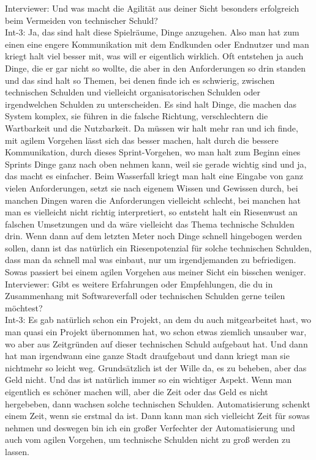 Interviewer: Und was macht die Agilität aus deiner Sicht besonders erfolgreich beim Vermeiden von technischer Schuld?\\
Int-3: Ja, das sind halt diese Spielräume, Dinge anzugehen. Also man hat zum einen eine engere Kommunikation mit dem Endkunden oder Endnutzer und man kriegt halt viel besser mit, was will er eigentlich wirklich. Oft entstehen ja auch Dinge, die er gar nicht so wollte, die aber in den Anforderungen so drin standen und das sind halt so Themen, bei denen finde ich es schwierig, zwischen technischen Schulden und vielleicht organisatorischen Schulden oder irgendwelchen Schulden zu unterscheiden. Es sind halt Dinge, die machen das System komplex, sie führen in die falsche Richtung, verschlechtern die Wartbarkeit und die Nutzbarkeit. Da müssen wir halt mehr ran und ich finde, mit agilem Vorgehen lässt sich das besser machen, halt durch die bessere Kommunikation, durch dieses Sprint-Vorgehen, wo man halt zum Beginn eines Sprints Dinge ganz nach oben nehmen kann, weil sie gerade wichtig sind und ja, das macht es einfacher. Beim Wasserfall kriegt man halt eine Eingabe von ganz vielen Anforderungen, setzt sie nach eigenem Wissen und Gewissen durch, bei manchen Dingen waren die Anforderungen vielleicht schlecht, bei manchen hat man es vielleicht nicht richtig interpretiert, so entsteht halt ein Riesenwust an falschen Umsetzungen und da wäre vielleicht das Thema technische Schulden drin. Wenn dann auf dem letzten Meter noch Dinge schnell hingebogen werden sollen, dann ist das natürlich ein Riesenpotenzial für solche technischen Schulden, dass man da schnell mal was einbaut, nur um irgendjemanden zu befriedigen. Sowas passiert bei einem agilen Vorgehen aus meiner Sicht ein bisschen weniger.\\
Interviewer: Gibt es weitere Erfahrungen oder Empfehlungen, die du in Zusammenhang mit Softwareverfall oder technischen Schulden gerne teilen möchtest?\\
Int-3: Es gab natürlich schon ein Projekt, an dem du auch mitgearbeitet hast, wo man quasi ein Projekt übernommen hat, wo schon etwas ziemlich unsauber war, wo aber aus Zeitgründen auf dieser technischen Schuld aufgebaut hat. Und dann hat man irgendwann eine ganze Stadt draufgebaut und dann kriegt man sie nichtmehr so leicht weg. Grundsätzlich ist der Wille da, es zu beheben, aber das Geld nicht. Und das ist natürlich immer so ein wichtiger Aspekt. Wenn man eigentlich es schöner machen will, aber die Zeit oder das Geld es nicht hergebeben, dann wachsen solche technischen Schulden. Automatisierung schenkt einem Zeit, wenn sie erstmal da ist. Dann kann man sich vielleicht Zeit für sowas nehmen und deswegen bin ich ein großer Verfechter der Automatisierung und auch vom agilen Vorgehen, um technische Schulden nicht zu groß werden zu lassen. \\


